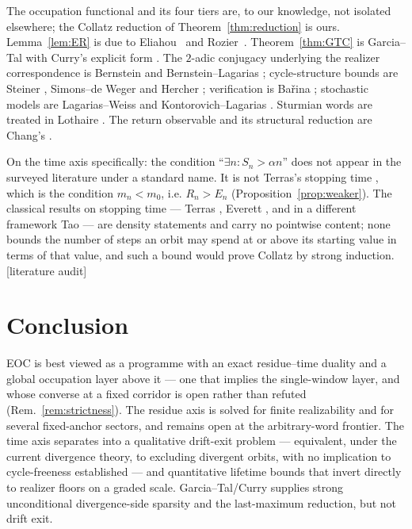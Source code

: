 \documentclass[11pt]{article}
\theoremstyle{plain}
\theoremstyle{definition}
\theoremstyle{remark}
\newcommand{\al}{\alpha}
\newcommand{\status}[1]{\textsf{\footnotesize[#1]}}
\begin{document}
The occupation functional and its four tiers are, to our knowledge, not isolated elsewhere; the
Collatz reduction of Theorem~\ref{thm:reduction} is ours. Lemma~\ref{lem:ER} is due to
Eliahou~\cite{Eliahou} and Rozier~\cite{Rozier}. Theorem~\ref{thm:GTC} is Garcia--Tal
\cite{GarciaTal} with Curry's explicit form \cite{Curry}. The $2$-adic conjugacy underlying the
realizer correspondence is Bernstein \cite{Bernstein} and Bernstein--Lagarias
\cite{BernsteinLagarias}; cycle-structure bounds are Steiner \cite{Steiner}, Simons--de Weger
\cite{SimonsdeWeger} and Hercher \cite{Hercher}; verification is Ba\v{r}ina \cite{Barina2021,Barina2025};
stochastic models are Lagarias--Weiss \cite{LagariasWeiss} and Kontorovich--Lagarias
\cite{KontorovichLagarias}. Sturmian words are treated in Lothaire \cite{Lothaire}. The return
observable and its structural reduction are Chang's \cite{Chang1,Chang2}.

On the time axis specifically: the condition ``$\exists n:S_n>\al n$'' does not appear in the
surveyed literature under a standard name. It is not Terras's stopping time \cite{Terras}, which is
the condition $m_n<m_0$, i.e. $R_n>E_n$ (Proposition~\ref{prop:weaker}). The classical results on
stopping time --- Terras \cite{Terras}, Everett \cite{Everett}, and in a different framework Tao
\cite{Tao} --- are density statements and carry no pointwise content; none bounds the number of
steps an orbit may spend at or above its starting value in terms of that value, and such a bound
would prove Collatz by strong induction. \status{literature audit}

\section{Conclusion}\label{sec:conclusion}

EOC is best viewed as a programme with an exact residue--time duality and a global occupation
layer above it --- one that implies the single-window layer, and whose converse at a fixed corridor
is open rather than refuted (Rem.~\ref{rem:strictness}). The residue axis is solved for finite realizability and for several
fixed-anchor sectors, and remains open at the arbitrary-word frontier. The time axis separates into
a qualitative drift-exit problem --- equivalent, under the current divergence theory, to excluding
divergent orbits, with no implication to cycle-freeness established --- and quantitative lifetime
bounds that invert
directly to realizer floors on a graded scale. Garcia--Tal/Curry supplies strong unconditional
divergence-side sparsity and the last-maximum reduction, but not drift exit.
\end{document}
